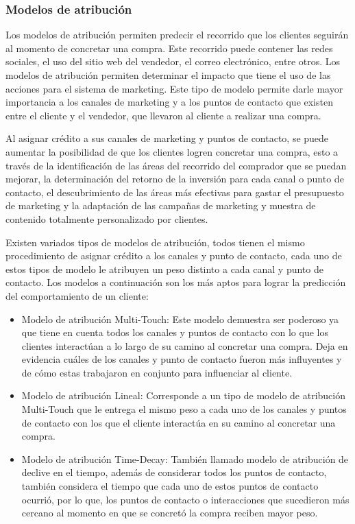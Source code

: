 \subsubsection{Modelos de atribución}

Los modelos de atribución permiten predecir el recorrido que los clientes seguirán al momento de concretar una compra. Este recorrido puede contener las redes sociales, el uso del sitio web del vendedor, el correo electrónico, entre otros. Los modelos de atribución permiten determinar el impacto que tiene el uso de las acciones para el sistema de marketing. Este tipo de modelo permite darle mayor importancia a los canales de marketing y a los puntos de contacto que existen entre el cliente y el vendedor, que llevaron al cliente a realizar una compra.

Al asignar crédito a sus canales de marketing y puntos de contacto, se puede aumentar la posibilidad de que los clientes logren concretar una compra, esto a través de la identificación de las áreas del recorrido del comprador que se puedan mejorar, la determinación del retorno de la inversión para cada canal o punto de contacto, el descubrimiento de las áreas más efectivas para gastar el presupuesto de marketing y la adaptación de las campañas de marketing y muestra de contenido totalmente personalizado por clientes.

Existen variados tipos de modelos de atribución, todos tienen el mismo procedimiento de asignar crédito a los canales y punto de contacto, cada uno de estos tipos de modelo le atribuyen un peso distinto a cada canal y punto de contacto. Los modelos a continuación son los más aptos para lograr la predicción del comportamiento de un cliente:

\begin{itemize}
    \item Modelo de atribución Multi-Touch: Este modelo demuestra ser poderoso ya que tiene en cuenta todos los canales y puntos de contacto con lo que los clientes interactúan a lo largo de su camino al concretar una compra. Deja en evidencia cuáles de los canales y punto de contacto fueron más influyentes y de cómo estas trabajaron en conjunto para influenciar al cliente.
    \item Modelo de atribución Lineal: Corresponde a un tipo de modelo de atribución Multi-Touch que le entrega el mismo peso a cada uno de los canales y puntos de contacto con los que el cliente interactúa en su camino al concretar una compra.
    \item Modelo de atribución Time-Decay: También llamado modelo de atribución de declive en el tiempo, además de considerar todos los puntos de contacto, también considera el tiempo que cada uno de estos puntos de contacto ocurrió, por lo que, los puntos de contacto o interacciones que sucedieron más cercano al momento en que se concretó la compra reciben mayor peso.
\end{itemize}


